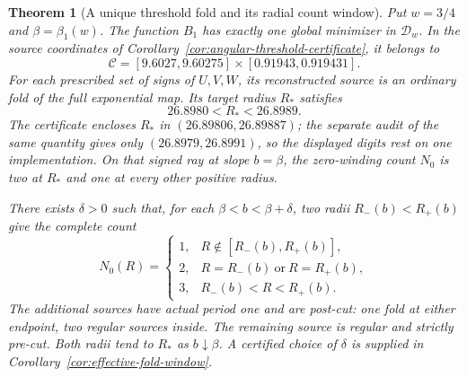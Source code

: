 \documentclass[11pt,a4paper]{article}
\newtheorem{theorem}{Theorem}[section]
\theoremstyle{remark}\newtheorem{remark}[theorem]{Remark}
\begin{document}
\begin{theorem}[A unique threshold fold and its radial count window]
\label{thm:threshold-fold-window}
Put $w=3/4$ and $\beta=\beta_1(w)$. The function $B_1$ has exactly
one global minimizer in $\mathcal D_w$. In the source coordinates of
Corollary~\ref{cor:angular-threshold-certificate}, it belongs to
\begin{equation}\label{eq:threshold-localization}
 \mathcal C=[9.6027,9.60275]\times[0.91943,0.919431].
\end{equation}
For each prescribed set of signs of $U,V,W$, its reconstructed source
is an ordinary fold of the full exponential map. Its target radius
$R_*$ satisfies
\begin{equation}\label{eq:threshold-radius}
 26.8980<R_*<26.8989.
\end{equation}
The certificate encloses $R_*$ in $(26.89806,26.89887)$; the separate
audit of the same quantity gives only $(26.8979,26.8991)$, so the
displayed digits rest on one implementation.
On that signed ray at slope $b=\beta$, the zero-winding count $N_0$
is two at $R_*$ and one at every other positive radius.

There exists $\delta>0$ such that, for each $\beta<b<\beta+\delta$,
two radii $R_-(b)<R_+(b)$ give the complete count
\begin{equation}\label{eq:threshold-window-count}
 N_0(R)=\begin{cases}
 1,&R\notin[R_-(b),R_+(b)],\\
 2,&R=R_-(b)\ \text{or}\ R=R_+(b),\\
 3,&R_-(b)<R<R_+(b).
 \end{cases}
\end{equation}
The additional sources have actual period one and are post-cut:
one fold at either endpoint, two regular sources inside. The remaining
source is regular and strictly pre-cut. Both radii tend to $R_*$ as
$b\downarrow\beta$. A certified choice of $\delta$ is supplied in
Corollary~\ref{cor:effective-fold-window}.
\end{theorem}
\end{document}
